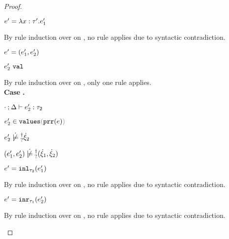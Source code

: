 \begin{proof}
\begin{byCases}
\begin{byCases}
\begin{byCases}
\begin{byCases}
\begin{byCases}
\begin{byCases}
\begin{byCases}
\begin{pfsteps*}
                \item $e'=\lambda x:\tau'.e_1'$ 
                \end{pfsteps*}
                By rule induction over  on , no rule applies due to syntactic contradiction.
                \item[\text{(\ref{rule:VPair})}] 
                \begin{pfsteps*} 
                \item $e'=(e_1' , e_2')$ 
                \item $e_2' ~\mathtt{val}$  
                \end{pfsteps*}
                By rule induction over  on , only one rule applies. \\
                  \textbf{Case} \text{(\ref{rule:TPair})}\textbf{.}
                  \begin{pfsteps*}
                  \item $\cdot \mathbin{;} \Delta \vdash e_2' : \tau_2$  
                  \item $\inValues{e_2'}{\hprr{e}}$  
                  \item $\cnotsatisfyormay{e_2'}{\hxi_2}$  
                  \item $\cnotsatisfyormay{\hpair{e_1'}{e_2'}}{\cpair{\hxi_1}{\hxi_2}}$ 
                  \end{pfsteps*}
                \item[\text{(\ref{rule:VInl})}] 
                \begin{pfsteps*} 
                \item $e'=\mathtt{inl}_{\tau_2}({e_1'})$ 
                \end{pfsteps*}
                By rule induction over  on , no rule applies due to syntactic contradiction.
                \item[\text{(\ref{rule:VInr})}] 
                \begin{pfsteps*} 
                \item $e'=\mathtt{inr}_{\tau_1}({e_2'})$ 
                \end{pfsteps*}
                By rule induction over  on , no rule applies due to syntactic contradiction.
              \end{byCases}
            \end{byCases}
          \end{byCases}


\end{byCases}
\end{byCases}
\end{byCases}
\end{byCases}
\end{proof}
